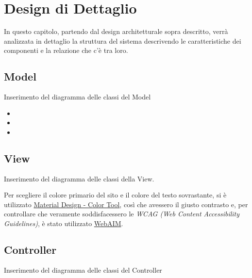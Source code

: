 \chapter{Design di Dettaglio}
In questo capitolo, partendo dal design architetturale sopra descritto, verrà analizzata in dettaglio la struttura del sistema descrivendo le caratteristiche dei componenti e la relazione che c'è tra loro.

    \section{Model}
    Inserimento del diagramma delle classi del Model
        \begin{itemize}
            \item 
            \item 
            \item 
        \end{itemize}
    \section{View}
    Inserimento del diagramma delle classi della View.
    
    Per scegliere il colore primario del sito e il colore del testo sovrastante, si è utilizzato \href{https://m2.material.io/resources/color/#!/?view.left=1&view.right=1&primary.color=8a171a&secondary.color=DEDEDE}{Material Design - Color Tool}, così che avessero il giusto contrasto e, per controllare che veramente soddisfacessero le \textit{WCAG (Web Content Accessibility Guidelines)}, è stato utilizzato \href{https://webaim.org/resources/contrastchecker/?fcolor=DEDEDE&bcolor=8A171A}{WebAIM}.
    
    \section{Controller}
    Inserimento del diagramma delle classi del Controller